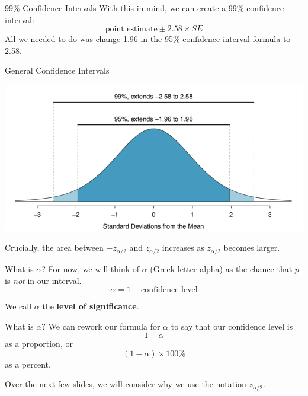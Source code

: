 \begin{frame}{99\% Confidence Intervals}
    With this in mind, we can create a 99\% confidence interval:
    \[
        \text{point estimate} \pm 2.58 \times SE
    \]
    All we needed to do was change 1.96 in the 95\% confidence interval formula to 2.58. 
\end{frame}

\begin{frame}{General Confidence Intervals}
    \begin{center}
        \includegraphics[scale=0.3]{images/zconfs.png}
    \end{center}
    Crucially, the area between $-z_{\alpha/2}$ and $z_{\alpha/2}$ increases as $z_{\alpha/2}$ becomes larger.
\end{frame}

\begin{frame}{What is $\alpha$?}
    For now, we will think of $\alpha$ (Greek letter alpha) as the chance that $p$ is \textit{not} in our interval.
    \[
        \alpha = 1 - \text{confidence level}
    \]
    
    \vspace{12pt}We call $\alpha$ the \textbf{level of significance}.
\end{frame}

\begin{frame}{What is $\alpha$?}
    We can rework our formula for $\alpha$ to say that our confidence level is
    \[
        1-\alpha
    \]
    as a proportion, or 
    \[
        (1-\alpha)\times100\% 
    \]
    as a percent. 
    
    \vspace{12pt}Over the next few slides, we will consider why we use the notation $z_{\alpha/2}$.
\end{frame}

